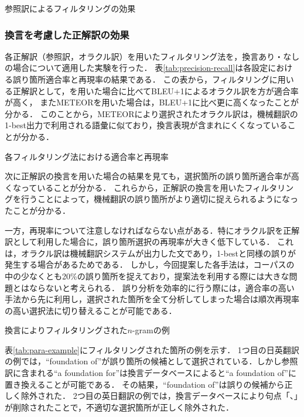 \documentclass[japanese]{jnlp_1.4}
\newcommand{\textcolor}[2]{}
\begin{document}
\begin{table}[b]
\caption{参照訳によるフィルタリングの効果}
\label{tab:filt}

\end{table}


\subsubsection{換言を考慮した正解訳の効果}

各正解訳（参照訳，\textcolor{black}{参照訳+}オラクル訳）を用いたフィルタリング法を，換言あり・なしの場合について適用した実験を行った．
表\ref{tab:precision-recall}は各設定における誤り箇所適合率と再現率の結果である．
この表から，フィルタリングに用いる正解訳として，\textcolor{black}{参照訳のみ}を用いた場合に比べてBLEU+1によるオラクル訳を\textcolor{black}{加えた}方が適合率が高く，
また\textcolor{black}{評価尺度として}METEORを用いた場合は，BLEU+1\textcolor{black}{を用いた場合}に比べ更に\textcolor{black}{適合率が}高くなったことが分かる．
このことから，METEORにより選択されたオラクル訳は，機械翻訳の1-best出力で利用される語彙に似ており，換言表現が含まれにくくなっていることが分かる．

\begin{table}[b]
\caption{各フィルタリング法における適合率と再現率}
\label{tab:precision-recall}

\end{table}

次に正解訳の換言を用いた場合の結果を見ても，選択箇所の誤り箇所適合率が高くなっていることが分かる．
これらから，正解訳の換言を用いたフィルタリングを行うことによって，機械翻訳の誤り箇所がより適切に捉えられるようになったことが分かる．

一方，再現率について注意しなければならない点がある．特にオラクル訳を正解訳として利用した場合に，誤り箇所選択の再現率が大きく低下している．
これは，オラクル訳は機械翻訳システムが出力した文であり，1-bestと同様の誤りが発生する場合があるためである．
しかし，今回提案した各手法は，コーパスの中の少なくとも20\%の誤り箇所を捉えており，提案法を利用する際には大きな問題とはならないと考えられる．
誤り分析を効率的に行う際には，適合率の高い手法から先に利用し，選択された箇所を全て分析してしまった場合は順次再現率の高い選択法に切り替えることが可能である．

\begin{table}[b]
\caption{換言によりフィルタリングされた$n$-gramの例}
\label{tab:para-example}
\setlength{\fboxsep}{0.1em}

\end{table}

表\ref{tab:para-example}にフィルタリングされた箇所の例を示す．
1つ目の日英翻訳の例では，``foundation of''が誤り箇所の候補として選択されている．しかし参照訳に含まれる``a foundation for''は換言データベースによると``a foundation of''に置き換えることが可能である．
その結果，``foundation of''は誤りの候補から正しく除外された．
2つ目の英日翻訳の例では，換言データベースにより句点「、」が削除されたことで，不適切な選択箇所が正しく除外された．
\end{document}
